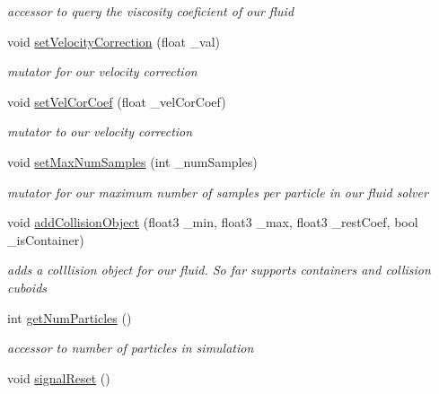 \begin{DoxyCompactItemize}
\begin{DoxyCompactList}\small\item\em accessor to query the viscosity coeficient of our fluid \end{DoxyCompactList}\item 
void \hyperlink{class_s_p_h_engine_a25796b907bd55473b09ac5683918c0c5}{set\-Velocity\-Correction} (float \-\_\-val)
\begin{DoxyCompactList}\small\item\em mutator for our velocity correction \end{DoxyCompactList}\item 
\hypertarget{class_s_p_h_engine_a6b418198ceab591b1abfa5f645dbc9d7}{void \hyperlink{class_s_p_h_engine_a6b418198ceab591b1abfa5f645dbc9d7}{set\-Vel\-Cor\-Coef} (float \-\_\-vel\-Cor\-Coef)}\label{class_s_p_h_engine_a6b418198ceab591b1abfa5f645dbc9d7}

\begin{DoxyCompactList}\small\item\em mutator to our velocity correction \end{DoxyCompactList}\item 
void \hyperlink{class_s_p_h_engine_aad9d9bc9a1a7e5f64a5e045c339f8b3e}{set\-Max\-Num\-Samples} (int \-\_\-num\-Samples)
\begin{DoxyCompactList}\small\item\em mutator for our maximum number of samples per particle in our fluid solver \end{DoxyCompactList}\item 
void \hyperlink{class_s_p_h_engine_afe2b02e535cf064f91f2de4312c8ae39}{add\-Collision\-Object} (float3 \-\_\-min, float3 \-\_\-max, float3 \-\_\-rest\-Coef, bool \-\_\-is\-Container)
\begin{DoxyCompactList}\small\item\em adds a colllision object for our fluid. So far supports containers and collision cuboids \end{DoxyCompactList}\item 
\hypertarget{class_s_p_h_engine_a387ab48532ca20b2eb31319e862e243b}{int \hyperlink{class_s_p_h_engine_a387ab48532ca20b2eb31319e862e243b}{get\-Num\-Particles} ()}\label{class_s_p_h_engine_a387ab48532ca20b2eb31319e862e243b}

\begin{DoxyCompactList}\small\item\em accessor to number of particles in simulation \end{DoxyCompactList}\item 
\hypertarget{class_s_p_h_engine_a692ed8ae0cdb67f4a774fa2a94ad635f}{void \hyperlink{class_s_p_h_engine_a692ed8ae0cdb67f4a774fa2a94ad635f}{signal\-Reset} ()}\label{class_s_p_h_engine_a692ed8ae0cdb67f4a774fa2a94ad635f}


\end{DoxyCompactItemize}
